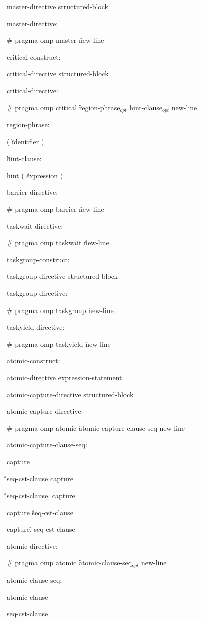{\I master-directive structured-block

master-directive:

\C\I \# pragma omp master \G new-line

critical-construct:

\I critical-directive structured-block

critical-directive:

\C\I \# pragma omp critical \G region-phrase$_{opt}$ hint-clause$_{opt}$ new-line

region-phrase:

\C\I ( \G identifier \C )

\G hint-clause: 

\C\I hint ( \G expression \C )

barrier-directive:

\C\I \# pragma omp barrier \G new-line

taskwait-directive:

\C\I \# pragma omp taskwait \G new-line

taskgroup-construct:

\I taskgroup-directive structured-block

taskgroup-directive:

\C\I \# pragma omp taskgroup \G new-line

taskyield-directive:

\C\I \# pragma omp taskyield \G new-line

atomic-construct:

\I atomic-directive expression-statement

\I atomic-capture-directive structured-block

atomic-capture-directive:

\C\I \# pragma omp atomic \G atomic-capture-clause-seq new-line

atomic-capture-clause-seq:

\C\I capture

\G\I seq-cst-clause \C capture

\G\I seq-cst-clause, \C capture

\I capture \G seq-cst-clause 

\C\I capture\G, seq-cst-clause 

atomic-directive:

\C\I \# pragma omp atomic \G atomic-clause-seq$_{opt}$ new-line

atomic-clause-seq:

\I atomic-clause

\I seq-cst-clause

}
